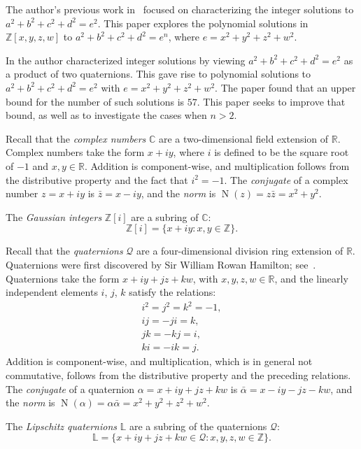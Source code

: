 \documentclass[12pt,table]{article}
\theoremstyle{definition}
\theoremstyle{remark}
\newcommand{\Ccc}{\mathbb C}
\newcommand{\Rrr}{\mathbb R}
\newcommand{\Zzz}{\mathbb Z}
\newcommand{\Lll}{\mathbb L}
\numberwithin{equation}{section}
\DeclareMathOperator{\N}{N}
\begin{document}
The author's previous work in~\cite{Ehrenborg_2018}
focused on characterizing the
integer solutions to
$a^2 + b^2 + c^2 + d^2 = e^2$.
This paper explores the polynomial solutions
in $ \Zzz[x,y,z,w] $ to
$a^2 + b^2 + c^2 + d^2 = e^n$, where
$e = x^2 + y^2 + z^2 + w^2$.

In \cite{Ehrenborg_2018} the author characterized integer
solutions by viewing $a^2 + b^2 + c^2 + d^2 = e^2$
as a product of two quaternions. This gave
rise to polynomial solutions to
$a^2 + b^2 + c^2 + d^2 = e^2$
with $e = x^2 + y^2 + z^2 + w^2$.
The paper found that an upper bound for the number
of such solutions is $57$. This paper seeks to
improve that bound, as well as to investigate
the cases when $n > 2$.



Recall that the \emph{complex numbers} $\Ccc$ are a two-dimensional
field extension of $\Rrr$.
Complex numbers take the form $x + iy$, where $i$ is defined to be the
square root of $-1$ and $x,y \in \Rrr$.
Addition is component-wise, and multiplication
follows from the distributive property and the fact that
$i^2 = -1$.
The \emph{conjugate} of a complex number $ z = x + iy$ is $ \bar{z} = x - iy$, and  
the \emph{norm} is $ \N(z) = z \bar{z} = x^2 + y^2$.  

The \emph{Gaussian integers} $ \Zzz[i] $ are a subring of $\Ccc$:
\[
\Zzz[i] = \{ x + iy: x,y \in \Zzz \}.
\]



Recall that
the \emph{quaternions} $\mathscr{Q}$ are a four-dimensional division ring extension of $\Rrr$.
Quaternions were first discovered by Sir William Rowan Hamilton;
see~\cite{Hamilton}.
Quaternions take the form $x + iy + jz + kw$, with
$x,y,z,w \in \Rrr$, and the linearly independent
elements $i$, $j$, $k$ satisfy the relations:
\begin{align*}
i^2 = j^2 = k^2 = -1,
\\
ij = -ji = k,
\\
jk = -kj = i,
\\
ki = -ik = j.
\end{align*}
Addition is component-wise, and multiplication, which is
in general not commutative,
follows from the distributive property and the preceding relations.
The \emph{conjugate} of a quaternion $ \alpha = x + iy + jz + kw$
is $ \bar{\alpha} = x - iy - jz - kw$,  
and the \emph{norm} is 
$ \N( \alpha ) = \alpha \bar{\alpha} = x^2 + y^2 + z^2 + w^2$.  

The \emph{Lipschitz quaternions} $ \Lll $ are a subring of
the quaternions $\mathscr{Q}$:
\[
\Lll = \{ x + iy + jz + kw \in \mathscr{Q}: x,y,z,w \in \Zzz \}.
\]
\end{document}
